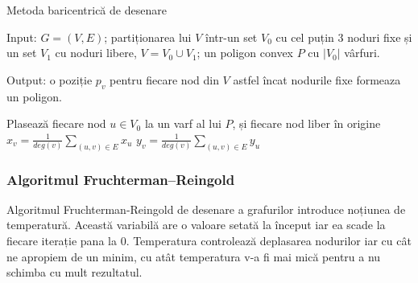 \begin{algorithm}[H]
    \caption{Metoda baricentrică de desenare \cite{force}}
    Input: \(G=(V,E)\);\newline
    partiționarea lui \(V\) într-un set \(V_0\) cu cel puțin 3 noduri fixe și un set \(V_1\) cu noduri libere, \(V=V_0 \cup V_1\);\newline
    un poligon convex \(P\) cu \(|V_0|\) vârfuri.\newline

    Output: o poziție \(p_v\) pentru fiecare nod din \(V\) astfel încat nodurile fixe formeaza un poligon.
        
    \begin{algorithmic}[1]
        \State Plasează fiecare nod \(u \in V_0\) la un varf al lui \(P\), și fiecare nod liber în origine
        \Repeat
            \State \(x_v=\frac{1}{deg(v)} \sum_{(u,v) \in E} x_u\)
            \State \(y_v=\frac{1}{deg(v)} \sum_{(u,v) \in E} y_u\)
        \EndFor
    \end{algorithmic}
\end{algorithm}

\subsubsection{Algoritmul Fruchterman–Reingold}

Algoritmul Fruchterman-Reingold de desenare a grafurilor introduce noțiunea de temperatură. Această variabilă are o valoare setată 
la început iar ea scade la fiecare iterație pana la \(0\). Temperatura controlează deplasarea nodurilor iar cu 
cât ne apropiem de un minim, cu atât temperatura v-a fi mai mică pentru a nu schimba cu mult rezultatul.\cite{force}

